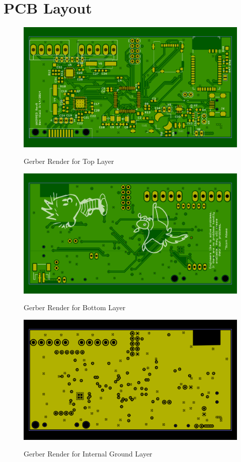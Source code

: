 \chapter{PCB Layout}
\label{chap:PCB_LAYOUT}

\begin{figure}
\begin{center}
	\label{fig:TOPGerber}
	\includegraphics[angle=0,scale=1,width=.8\textwidth]{Images/Rev5_TOPGERB.png} 
	\caption{Gerber Render for Top Layer}
\end{center}
\end{figure}


\begin{figure}
\begin{center}
	\label{fig:BOTGerber}
	\includegraphics[angle=0,scale=1,width=.8\textwidth]{Images/Rev5_BOTGERB.png} 
	\caption{Gerber Render for Bottom Layer}
\end{center}
\end{figure}


\begin{figure}
\begin{center}
	\label{fig:GNDGerber}
	\includegraphics[angle=0,scale=1,width=.8\textwidth]{Images/Rev5_GNDGERB.png} 
	\caption{Gerber Render for Internal Ground Layer}
\end{center}
\end{figure}


